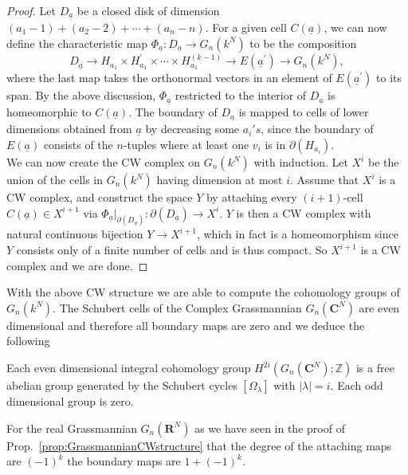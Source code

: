 \documentclass[a4paper,openany]{scrbook}
\begin{document}
\begin{proof}
Let $D_{\underline{a}}$ be a closed disk of dimension $(a_1-1)+(a_2-2)+\cdots +(a_n-n)$. For a given cell $C(\underline{a})$, we can now define the characteristic map $\Phi_{\underline{a}}: D_{\underline{a}}\rightarrow G_n(k^N)$ to be the composition 
$$
D_{\underline{a}}\rightarrow H_{a_1}\times H^\prime_{a_1}\times \cdots \times H^{(k-1)}_{a_1}\rightarrow E(\underline{a}^\prime)\rightarrow G_n(k^N),
$$
where the last map takes the orthonormal vectors in an element of $E(\underline{a}^\prime)$ to its span. By the above discussion, $\Phi_{\underline{a}}$ restricted to the interior of $D_{\underline{a}}$ is homeomorphic to $C(\underline{a})$. The boundary of $D_{\underline{a}}$ is mapped to cells of lower dimensions obtained from $\underline{a}$ by decreasing some $a_i's$,  since the boundary of $E(\underline{a})$ consists of the $n$-tuples where at least one $v_i$ is in $\partial(H_{a_i})$.\\
We can now create the CW complex on $G_n(k^N)$ with induction. Let $X^i$ be the union of the cells in $G_n(k^N)$ having dimension at most $i$. Assume that $X^i$ is a CW complex, and construct the space $Y$ by attaching every $(i+1)$-cell $C(\underline{a})\in X^{i+1}$ via $\Phi_{\underline{a}}\vert_{\partial(D_{\underline{a}})}:\partial(D_{\underline{a}}) \rightarrow X^i$. $Y$ is then a CW complex with natural continuous bijection $Y\rightarrow X^{i+1}$, which in fact is a homeomorphism since $Y$ consists only of a finite number of cells and is thus compact. So $X^{i+1}$ is a CW complex and we are done.
\end{proof}
With the above CW structure we are able to compute the cohomology groups of $G_n(k^N)$.
The Schubert cells of the Complex Grassmannian $G_n(\mathbf{C}^N)$ are even dimensional and therefore all boundary maps are zero and we deduce the following
\begin{thm}
Each even dimensional integral cohomology group $H^{2i}(G_n(\mathbf{C}^N) ;\mathbb{Z})$ is a free abelian group generated by the Schubert cycles $\left[\Omega_\lambda \right]$ with $|\lambda | =i$. Each odd dimensional group is zero.
\end{thm}
\begin{remark}
For the real Grassmannian $G_n(\mathbf{R}^N)$ as we have seen in the proof of Prop.~\ref{prop:GrassmannianCWstructure} that the degree of the attaching maps are $(-1)^k$ the boundary maps are $1+(-1)^k$. 
\end{remark}
\end{document}
